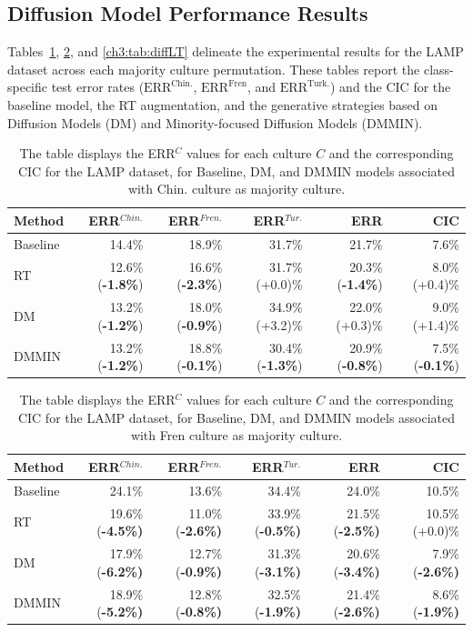 \subsection{Diffusion Model Performance Results}\label{ch3:sec:diff}Tables~\ref{ch3:tab:diffLC}, \ref{ch3:tab:diffLF}, and \ref{ch3:tab:diffLT} delineate the experimental results for the LAMP dataset across each majority culture permutation. These tables report the class-specific test error rates ($\text{ERR}^{\text{Chin.}}$, $\text{ERR}^{\text{Fren}}$, and $\text{ERR}^{\text{Turk.}}$) and the CIC for the baseline model, the RT augmentation, and the generative strategies based on Diffusion Models (DM) and Minority-focused Diffusion Models (DMMIN).
%
\begin{table}
\centering
\begin{tabular}{lrrrrr}
\toprule
\textbf{Method} & \textbf{ERR$^{Chin.}$} & \textbf{ERR$^{Fren.}$} & \textbf{ERR$^{Tur.}$} & \textbf{ERR} & \textbf{CIC} \\
\midrule
Baseline     & 14.4\% & 18.9\% & 31.7\% & 21.7\% & 7.6\% \\
RT           & 12.6\% (\textbf{-1.8\%}) & 16.6\% (\textbf{-2.3\%}) & 31.7\% (+0.0)\% & 20.3\% (\textbf{-1.4\%}) & 8.0\% (+0.4)\% \\
DM           & 13.2\% (\textbf{-1.2\%}) & 18.0\% (\textbf{-0.9\%}) & 34.9\% (+3.2)\% & 22.0\% (+0.3)\% & 9.0\% (+1.4)\% \\
DMMIN        & 13.2\% (\textbf{-1.2\%}) & 18.8\% (\textbf{-0.1\%}) & 30.4\% (\textbf{-1.3\%}) & 20.9\% (\textbf{-0.8\%}) & 7.5\% (\textbf{-0.1\%}) \\
\bottomrule
\end{tabular}
\caption{The table displays the ERR$^C$ values for each culture $C$ and the corresponding CIC for the LAMP dataset, for Baseline, DM, and DMMIN models associated with Chin. culture as majority culture.}
\label{ch3:tab:diffLC}
\end{table}
%
%
\begin{table}
\centering
\begin{tabular}{lrrrrr}
\toprule
\textbf{Method} & \textbf{ERR$^{Chin.}$} & \textbf{ERR$^{Fren.}$} & \textbf{ERR$^{Tur.}$} & \textbf{ERR} & \textbf{CIC} \\
\midrule
Baseline     & 24.1\% & 13.6\% & 34.4\% & 24.0\% & 10.5\% \\
RT           & 19.6\% (\textbf{-4.5\%)} & 11.0\% (\textbf{-2.6\%)} & 33.9\% (\textbf{-0.5\%)} & 21.5\% (\textbf{-2.5\%)} & 10.5\% (+0.0)\% \\
DM           & 17.9\% (\textbf{-6.2\%)} & 12.7\% (\textbf{-0.9\%)} & 31.3\% (\textbf{-3.1\%)} & 20.6\% (\textbf{-3.4\%)} & 7.9\% (\textbf{-2.6\%)} \\
DMMIN        & 18.9\% (\textbf{-5.2\%)} & 12.8\% (\textbf{-0.8\%)} & 32.5\% (\textbf{-1.9\%)} & 21.4\% (\textbf{-2.6\%)} & 8.6\% (\textbf{-1.9\%)} \\
\bottomrule
\end{tabular}
\caption{The table displays the ERR$^C$ values for each culture $C$ and the corresponding CIC for the LAMP dataset, for Baseline, DM, and DMMIN models associated with Fren culture as majority culture.}
\label{ch3:tab:diffLF}
\end{table}

